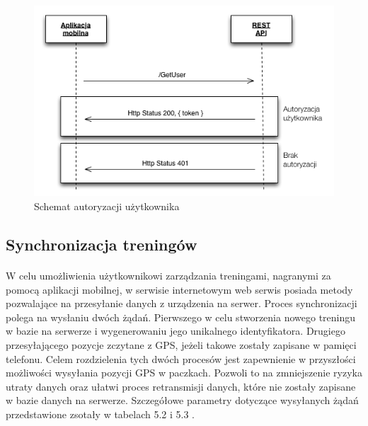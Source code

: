 \begin{figure}[ht]
	\centering
		\includegraphics[width=1\linewidth]{assets/auth_schema.png}
		\caption{Schemat autoryzacji użytkownika}
	\label{fig:auth_schema}
\end{figure}

\newpage

\subsection{Synchronizacja treningów} %
\label{sub:synchronizacja_trening_w}
\paragraph{} %
\label{par:}
W celu umożliwienia użytkownikowi zarządzania treningami, nagranymi za pomocą aplikacji mobilnej, w serwisie internetowym web serwis posiada metody pozwalające na przesyłanie danych z urządzenia na serwer. Proces synchronizacji polega na wysłaniu dwóch żądań. Pierwszego w celu stworzenia nowego treningu w bazie na serwerze i wygenerowaniu jego unikalnego identyfikatora. Drugiego przesyłającego pozycje zczytane z GPS, jeżeli takowe zostały zapisane w pamięci telefonu. Celem rozdzielenia tych dwóch procesów jest zapewnienie w przyszłości możliwości wysyłania pozycji GPS w paczkach. Pozwoli to na zmniejszenie ryzyka utraty danych oraz ułatwi proces retransmisji danych, które nie zostały zapisane w bazie danych na serwerze. Szczegółowe parametry dotyczące wysyłanych żądań przedstawione zsotały w tabelach 5.2 i 5.3 .

